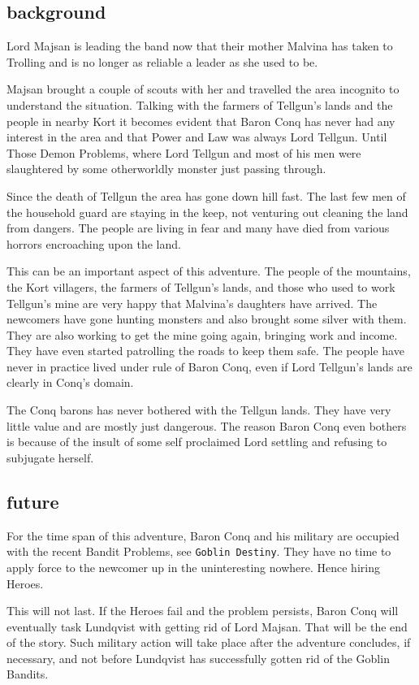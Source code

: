 \subsection*{background}
Lord Majsan is leading the band now that their mother Malvina has taken to Trolling and is no longer as reliable a leader as she used to be.

Majsan brought a couple of scouts with her and travelled the area incognito to understand the situation. Talking with the farmers of Tellgun's lands and the people in nearby Kort it becomes evident that Baron Conq has never had any interest in the area and that Power and Law was always Lord Tellgun. Until Those Demon Problems, where Lord Tellgun and most of his men were slaughtered by some otherworldly monster just passing through.

Since the death of Tellgun the area has gone down hill fast. The last few men of the household guard are staying in the keep, not venturing out cleaning the land from dangers. The people are living in fear and many have died from various horrors encroaching upon the land.

This can be an important aspect of this adventure. The people of the mountains, the Kort villagers, the farmers of Tellgun's lands, and those who used to work Tellgun's mine are very happy that Malvina's daughters have arrived. The newcomers have gone hunting monsters and also brought some silver with them. They are also working to get the mine going again, bringing work and income. They have even started patrolling the roads to keep them safe. The people have never in practice lived under rule of Baron Conq, even if Lord Tellgun's lands are clearly in Conq's domain.

The Conq barons has never bothered with the Tellgun lands. They have very little value and are mostly just dangerous. The reason Baron Conq even bothers is because of the insult of some self proclaimed Lord settling and refusing to subjugate herself.


\subsection*{future}
For the time span of this adventure, Baron Conq and his military are occupied with the recent Bandit Problems, see \texttt{Goblin Destiny}. They have no time to apply force to the newcomer up in the uninteresting nowhere. Hence hiring Heroes.

This will not last. If the Heroes fail and the problem persists, Baron Conq will eventually task Lundqvist with getting rid of Lord Majsan. That will be the end of the story. Such military action will take place after the adventure concludes, if necessary, and not before Lundqvist has successfully gotten rid of the Goblin Bandits.


